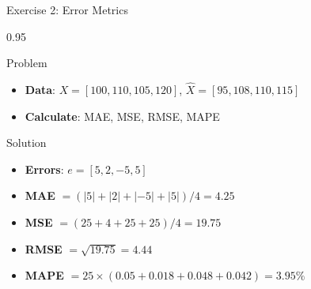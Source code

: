 \documentclass[9pt, aspectratio=169, t]{beamer}
\begin{document}
\begin{frame}{Exercise 2: Error Metrics}
    \begin{cminipage}{0.95\textwidth}
    \begin{alertblock}{Problem}
        \begin{itemize}\setlength{\itemsep}{0pt}
            \item \textbf{Data}: $X = [100, 110, 105, 120]$, $\hat{X} = [95, 108, 110, 115]$
            \item \textbf{Calculate}: MAE, MSE, RMSE, MAPE
        \end{itemize}
    \end{alertblock}

    \vspace{0.2cm}
    \begin{exampleblock}{Solution}
        \begin{itemize}\setlength{\itemsep}{0pt}
            \item \textbf{Errors}: $e = [5, 2, -5, 5]$
            \item \textbf{MAE} $= (|5|+|2|+|-5|+|5|)/4 = 4.25$
            \item \textbf{MSE} $= (25+4+25+25)/4 = 19.75$
            \item \textbf{RMSE} $= \sqrt{19.75} = 4.44$
            \item \textbf{MAPE} $= 25 \times (0.05+0.018+0.048+0.042) = 3.95\%$
        \end{itemize}
    \end{exampleblock}
    \end{cminipage}
\end{frame}
\end{document}
